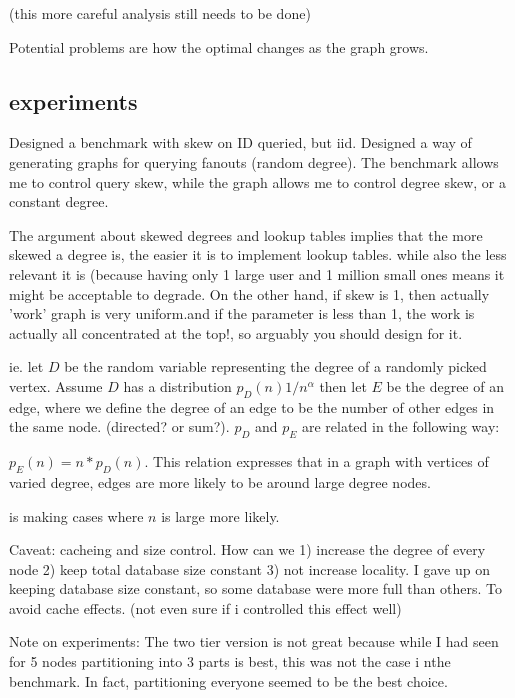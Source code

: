 \documentclass[11pt]{article}
\begin{document}
(this more careful analysis still needs to be done)

Potential problems are how the optimal changes as the graph grows.


\subsection{experiments}

Designed a benchmark with skew on ID queried, but iid. Designed a way of generating graphs for querying fanouts (random degree). The benchmark allows me to control 
query skew, while the graph allows me to control degree skew, or a constant degree.

The argument about skewed degrees and lookup tables implies that the more skewed a degree is, the easier it is to implement lookup tables. while also the less relevant it is
(because having only 1 large user and 1 million small ones means it might be acceptable to degrade. On the other hand, if skew is 1, then actually 'work' graph is very uniform.and if the parameter is less than 1, the work is actually all concentrated at the top!, so arguably you should design for it.

ie. let  \(D\) be the random variable representing the degree of a randomly picked vertex. Assume \(D\) has a distribution \(p_D(n) 1/n^\alpha \) then let \(E \) be the degree of an edge, where we define the degree of an edge to be the number of other edges in the same node. (directed? or sum?). \(p_D \) and  \(p_E \) are related in the following way:

\( p_E(n) = n*p_D(n)\). This relation expresses that in a graph with vertices of varied degree, edges are more likely to be around large degree nodes. 


 is making cases where \(n \) is large more likely. 

Caveat: cacheing and size control. How can we 1) increase the degree of every node 2) keep total database size constant 3) not increase locality.
I gave up on keeping database size constant, so some database were more full than others. To avoid cache effects. (not even sure if i controlled this effect well)

Note on experiments:
The two tier version is not great because while I had seen for 5 nodes partitioning into 3 parts is best, this was not the case i nthe benchmark.
In fact, partitioning everyone seemed to be the best choice.
\end{document}

